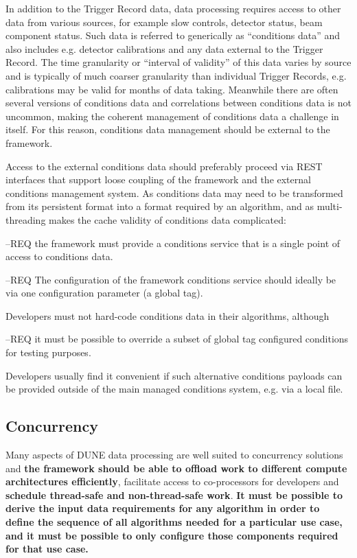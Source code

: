 \documentclass[../main-v1.tex]{subfiles}
\begin{document}
In addition to the Trigger Record data, data processing requires access to other data from various sources, for example slow controls, detector status, beam component status.  Such data is referred to generically as “conditions data” and also includes e.g. detector calibrations and any data external to the Trigger Record.  The time granularity or “interval of validity” of this data varies by source and is typically of much coarser granularity than individual Trigger Records, e.g. calibrations may be valid for months of data taking.  Meanwhile there are often several versions of conditions data and correlations between conditions data is not uncommon, making the coherent management of conditions data a challenge in itself.  For this reason, conditions data management should be external to the framework.

Access to the external conditions data should preferably proceed via REST interfaces that support loose coupling of the framework and the external conditions management system.  As conditions data may need to be transformed from its persistent format into a format required by an algorithm, and as multi-threading makes the cache validity of conditions data complicated: 

--REQ the framework must provide a conditions service that is a single point of access to conditions data.  

--REQ The configuration of the framework conditions service should ideally be via one configuration parameter (a global tag). 

Developers must not hard-code conditions data in their algorithms, although 

--REQ it must be possible to override a subset of global tag configured conditions for testing purposes.  

Developers usually find it convenient if such alternative conditions payloads can be provided outside of the main managed conditions system, e.g. via a local file.


\subsection{Concurrency} %
Many aspects of DUNE data processing are well suited to concurrency solutions and {\bf the framework should be able to offload work to different compute architectures efficiently}, facilitate access to co-processors for developers and {\bf schedule thread-safe and non-thread-safe work}.  {\bf It must be possible to derive the input data requirements for any algorithm in order to define the sequence of all algorithms needed for a particular use case, and it must be possible to only configure those components required for that use case.}
\end{document}
